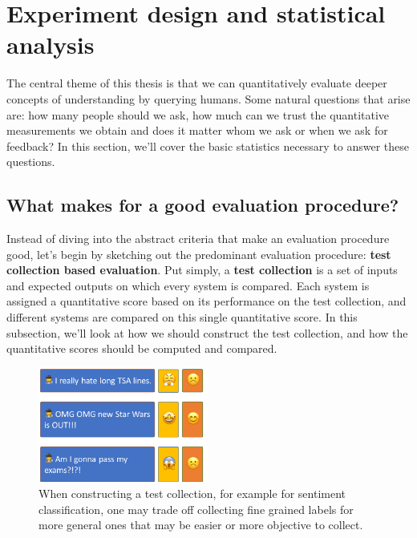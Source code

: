 \section{\label{sec:setup:statistical} Experiment design and statistical analysis}

The central theme of this thesis is that we can quantitatively evaluate deeper concepts of understanding by querying humans.
Some natural questions that arise are: how many people should we ask, how much can we trust the quantitative measurements we obtain and does it matter whom we ask or when we ask for feedback?
In this section, we'll cover the basic statistics necessary to answer these questions.

\subsection{What makes for a good evaluation procedure?}

Instead of diving into the abstract criteria that make an evaluation procedure good, let's begin by sketching out the predominant evaluation procedure: \textbf{test collection based evaluation}.
Put simply, a \textbf{test collection} is a set of inputs and expected outputs on which every system is compared.
Each system is assigned a quantitative score based on its performance on the test collection, and different systems are compared on this single quantitative score.
In this subsection, we'll look at how we should construct the test collection, and how the quantitative scores should be computed and compared.

\begin{figure}
  \centering
  \includegraphics[width=0.5\textwidth]{figures/sentiment-choices}
  \caption[Constructing test collections]{\label{setup:sentiment-choices} When constructing a test collection, for example for sentiment classification, one may trade off collecting fine grained labels for more general ones that may be easier or more objective to collect.}
\end{figure}

